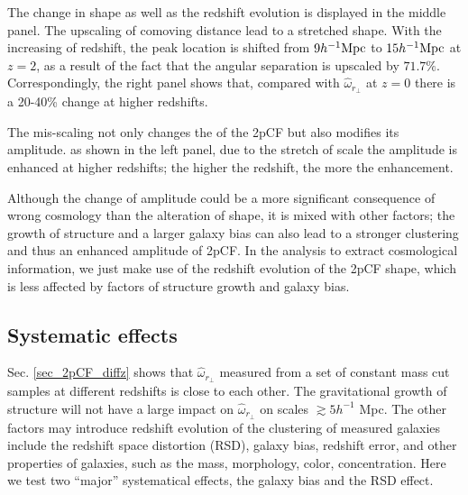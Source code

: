 \documentclass[iop]{emulateapj}
\begin{document}
The change in shape as well as the redshift evolution is displayed in the middle panel.
The upscaling of comoving distance lead to a stretched shape.
With the increasing of redshift,
the peak location is shifted from $9h^{-1} \rm Mpc$ to $15 h^{-1}\rm Mpc$ at $z=2$,
as a result of the fact that the angular separation is upscaled by $71.7\%$.
Correspondingly, the right panel shows that, 
compared with $\hat \omega_{r_\perp}$ at $z=0$ there is a 20-40\% change at higher redshifts.

The mis-scaling not only changes the of the 2pCF but also modifies its amplitude. %
as shown in the left panel, due to the stretch of scale the amplitude is enhanced at higher redshifts;
the higher the redshift, the more the enhancement.%

Although the change of amplitude could be a more significant consequence of wrong cosmology than the alteration of shape,
it is mixed with other factors; 
the growth of structure and a larger galaxy bias can also lead to a stronger clustering and thus an enhanced amplitude of 2pCF.
In the analysis to extract cosmological information, we just make use of the redshift evolution of the 2pCF shape, 
which is less affected by factors of structure growth and galaxy bias.



\subsection{Systematic effects}


Sec. \ref{sec_2pCF_diffz} shows that $\hat \omega_{r_\perp}$ measured from a set of constant mass cut samples at different redshifts is close to each other.
The gravitational growth of structure will not have a large impact on $\hat \omega_{r_\perp}$ on scales $\gtrsim5 h^{-1}$ Mpc.
The other factors may introduce redshift evolution of the clustering of measured galaxies include the 
redshift space distortion (RSD), galaxy bias, redshift error, and other properties of galaxies, such as the mass, morphology, color, concentration. 
Here we test two ``major'' systematical effects, the galaxy bias and the RSD effect.
\end{document}
